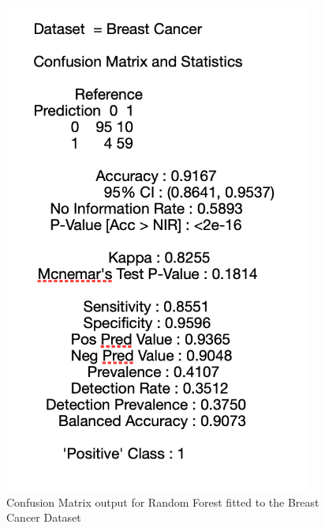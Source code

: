 \begin{figure}[!htbp]
\begin{minipage}{0.45\textwidth}
        \includegraphics[width=0.9\textwidth]{ThesisTemplate/appendix/images/Chapter5Appendix/ConfusionMatrix/BreastCancer.png} 
        \caption{Confusion Matrix output for Random Forest fitted to the Breast Cancer Dataset}
        \label{fig:matrixBC}
    \end{minipage}
\end{figure}

